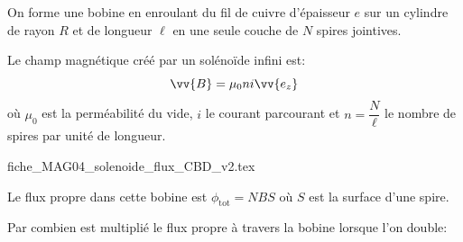 







\hauteurLargeurCadreReponse		{6mm}{2.5cm}
\initialisationEntrainement



On forme une bobine en enroulant du fil de cuivre d'épaisseur $e$ sur un cylindre de rayon $R$ et de longueur $\ell$ en une seule couche de $N$ spires jointives. 

Le champ magnétique créé par un solénoïde infini est:
\[
\vv{B}=\mu_{0}ni \vv{e_z}
\]
où $\mu_{0}$ est la perméabilité du vide, $i$ le courant parcourant et $n=\dfrac{N}{\ell}$ le nombre de spires par unité de longueur. 

\begin{center}
{fiche_MAG04_solenoide_flux_CBD_v2.tex}
\end{center}

Le flux propre dans cette bobine est 
\(
\phi_{\text{tot}}=NBS
\)
où $S$ est la surface d'une spire.

\bigskip

\debutEntrainement

Par combien est multiplié le flux propre à travers la bobine lorsque l'on double: 


